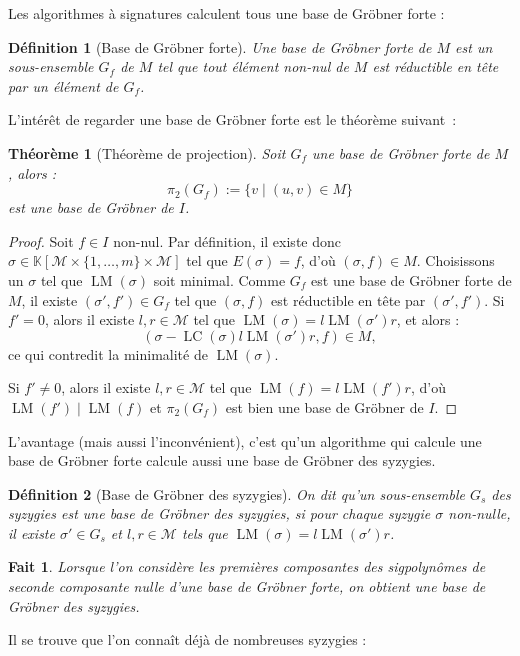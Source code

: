 \documentclass{article}
\newtheorem*{thm}{Théorème}
\newtheorem*{fact}{Fait}
\newtheorem*{dfn}{Définition}
\newcommand{\K}{\mathbb{K}}
\newcommand{\M}{\mathcal{M}}
\newcommand{\CR}{\K[\M\times\{1, \dots, m\}\times\M]}
\DeclareMathOperator{\LM}{LM}
\DeclareMathOperator{\LC}{LC}
\begin{document}
Les algorithmes à signatures calculent tous une base de Gröbner forte :

\begin{dfn}[Base de Gröbner forte]
	Une base de Gröbner forte de $M$ est un sous-ensemble $G_f$ de $M$ tel que tout élément non-nul de $M$ est réductible en tête par un élément de $G_f$.
\end{dfn}

L'intérêt de regarder une base de Gröbner forte est le théorème suivant~:

\begin{thm}[Théorème de projection]
	Soit $G_f$ une base de Gröbner forte de $M$, alors :
	$$\pi_2(G_f) := \{v \;|\; (u, v) \in M\}$$
	est une base de Gröbner de $I$.
\end{thm}
\begin{proof}
	Soit $f \in I$ non-nul. Par définition, il existe donc $\sigma \in \CR$ tel que $E(\sigma) = f$, d'où $(\sigma, f) \in M$. Choisissons un $\sigma$ tel que $\LM(\sigma)$ soit minimal.
	Comme $G_f$ est une base de Gröbner forte de $M$, il existe $(\sigma', f') \in G_f$ tel que $(\sigma, f)$ est réductible en tête par $(\sigma', f')$.
	Si $f' = 0$, alors il existe $l, r \in \M$ tel que $\LM(\sigma) = l\LM(\sigma')r$, et alors :
	$$(\sigma - \LC(\sigma)l\LM(\sigma')r, f) \in M,$$
	ce qui contredit la minimalité de $\LM(\sigma)$.
	
	Si $f' \neq 0$, alors il existe $l, r \in \M$ tel que $\LM(f) = l\LM(f')r$, d'où $\LM(f') \;|\; \LM(f)$ et $\pi_2(G_f)$ est bien une base de Gröbner de $I$.
\end{proof}

L'avantage (mais aussi l'inconvénient), c'est qu'un algorithme qui calcule une base de Gröbner forte calcule aussi une base de Gröbner des syzygies.

\begin{dfn}[Base de Gröbner des syzygies]
	On dit qu'un sous-ensemble $G_s$ des syzygies est une base de Gröbner des syzygies, si pour chaque syzygie $\sigma$ non-nulle, il existe $\sigma' \in G_s$ et $l, r \in \M$ tels que $\LM(\sigma) = l\LM(\sigma')r$.
\end{dfn}

\begin{fact}
Lorsque l'on considère les premières composantes des sigpolynômes de seconde composante nulle d'une base de Gröbner forte, on obtient une base de Gröbner des syzygies.
\end{fact}

Il se trouve que l'on connaît déjà de nombreuses syzygies :
\end{document}
